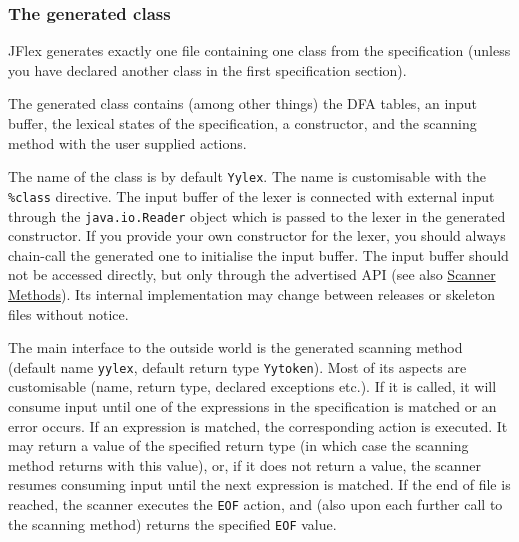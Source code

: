 \subsubsection{The generated class}\label{the-generated-class}

JFlex generates exactly one file containing one class from the
specification (unless you have declared another class in the first
specification section).

The generated class contains (among other things) the DFA tables, an
input buffer, the lexical states of the specification, a constructor,
and the scanning method with the user supplied actions.

The name of the class is by default \texttt{Yylex}. The name is
customisable with the \texttt{\%class} directive. The input buffer of
the lexer is connected with external input through the
\texttt{java.io.Reader} object which is passed to the lexer in the
generated constructor. If you provide your own constructor for the
lexer, you should always chain-call the generated one to initialise the
input buffer. The input buffer should not be accessed directly, but only
through the advertised API (see also \hyperref[ScannerMethods]{Scanner
Methods}). Its internal implementation may change between releases or
skeleton files without notice.

The main interface to the outside world is the generated scanning method
(default name \texttt{yylex}, default return type \texttt{Yytoken}).
Most of its aspects are customisable (name, return type, declared
exceptions etc.). If it is called, it will consume input until one of
the expressions in the specification is matched or an error occurs. If
an expression is matched, the corresponding action is executed. It may
return a value of the specified return type (in which case the scanning
method returns with this value), or, if it does not return a value, the
scanner resumes consuming input until the next expression is matched. If
the end of file is reached, the scanner executes the \texttt{EOF}
action, and (also upon each further call to the scanning method) returns
the specified \texttt{EOF} value.


